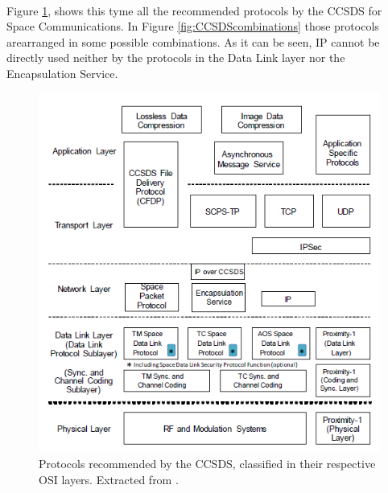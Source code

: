 \paragraph{}Figure \ref{fig:CCSDSprotocols}, shows this tyme all the recommended protocols by the CCSDS for Space Communications. In Figure \ref{fig:CCSDScombinations} those protocols arearranged in some possible combinations. As it can be seen, IP cannot be directly used neither by the protocols in the Data Link layer nor the Encapsulation Service.
\begin{figure}[H]
\begin{center}
\includegraphics[scale=0.6]{CCSDSprotocols.PNG}
\caption[CCSDS Recommended Protocols]{Protocols recommended by the CCSDS, classified in their respective OSI layers. Extracted from \cite{CCSDSOverview}.}
\label{fig:CCSDSprotocols}
\end{center}
\end{figure}
